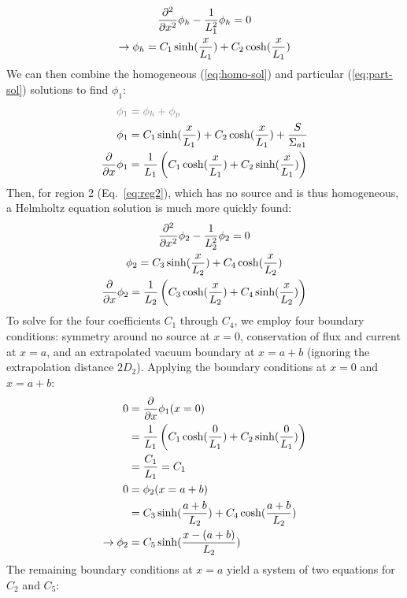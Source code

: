 \documentclass[12pt]{article}
\begin{document}
\begin{gather}
    \frac{\partial^2}{\partial x^2} \phi_h - \frac{1}{L_1^2}\phi_h = 0 \nonumber\\
    \label{eq:homo-sol}
    \rightarrow\phi_h = C_1\sinh(\frac{x}{L_1}) + C_2\cosh(\frac{x}{L_1}) \\
\end{gather}
We can then combine the homogeneous (\ref{eq:homo-sol}) and particular (\ref{eq:part-sol}) solutions to find $\phi_1$:
\begin{align}
    \color{gray}\phi_1&\color{gray}=\phi_h+\phi_p\\
    \label{eq:reg1-source-sol}
    \phi_1 &= C_1\sinh(\frac{x}{L_1}) + C_2\cosh(\frac{x}{L_1}) + \frac{S}{\Sigma_{a1}} \\
    \label{eq:reg1-source-diff}
    \ddx \phi_1 &= \frac{1}{L_1}\left(C_1\cosh(\frac{x}{L_1}) + C_2\sinh(\frac{x}{L_1})\right)
\end{align}
Then, for region 2 (Eq.~\ref{eq:reg2}), which has no source and is thus homogeneous, a Helmholtz equation solution is much more quickly found:
\begin{gather}
    \frac{\partial^2}{\partial x^2}\phi_2 - \frac{1}{L_2^2}\phi_2 = 0\nonumber\\
    \label{eq:reg2-sol}
    \phi_2 = C_3\sinh(\frac{x}{L_2}) + C_4\cosh(\frac{x}{L_2})\\
    \label{eq:reg2-diff}
    \frac{\partial}{\partial x} \phi_2 = \frac{1}{L_2}\left(C_3\cosh(\frac{x}{L_2}) + C_4\sinh(\frac{x}{L_2})\right)
\end{gather}
To solve for the four coefficients $C_1$ through $C_4$, we employ four boundary conditions: symmetry around no source at $x=0$, conservation of flux and current at $x=a$, and an extrapolated vacuum boundary at $x=a+b$ (ignoring the extrapolation distance $2D_2$).
Applying the boundary conditions at $x=0$ and $x=a+b$:
\begin{align}
    \label{eq:sym-bound}
    0 &= \frac{\partial}{\partial x} \phi_1(x=0) \\
      &= \frac{1}{L_1}\left(C_1\cosh(\frac{0}{L_1}) + C_2\sinh(\frac{0}{L_1})\right)\nonumber\\
      &= \frac{C_1}{L_1} = C_1\nonumber\\
    \label{eq:vac-bound}
    0 &= \phi_2(x=a+b)\\
      &= C_3\sinh(\frac{a+b}{L_2}) + C_4\cosh(\frac{a+b}{L_2})\nonumber\\
    \rightarrow\phi_2&=C_5\sinh(\frac{x-(a+b)}{L_2})
\end{align}
The remaining boundary conditions at $x=a$ yield a system of two equations for $C_2$ and $C_5$:
\end{document}
